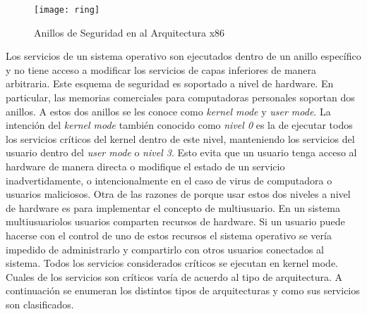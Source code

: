 \begin{figure}[htbp]
  \centering
  \texttt{[image: ring]}
  \caption{Anillos de Seguridad en al Arquitectura x86}
  \label{fig:ring}
\end{figure}

Los servicios de un sistema operativo son ejecutados dentro de un anillo
específico y no tiene acceso a modificar los servicios de capas inferiores de
manera arbitraria. Este esquema de seguridad es soportado a nivel de
hardware. En particular, las memorias comerciales para computadoras personales
soportan dos anillos. A estos dos anillos se les conoce como \emph{kernel mode}
y \emph{user mode}. La intención del \emph{kernel mode} también conocido como
\emph{nivel 0} es la de ejecutar todos los servicios críticos del kernel dentro
de este nivel, manteniendo los servicios del usuario dentro del \emph{user
mode} o \emph{nivel 3}. Esto evita que un usuario tenga acceso al hardware de
manera directa o modifique el estado de un servicio inadvertidamente, o
intencionalmente en el caso de virus de computadora o usuarios maliciosos. Otra
de las razones de porque usar estos dos niveles a nivel de hardware es para
implementar el concepto de multiusuario. En un sistema multiusuariolos usuarios
comparten recursos de hardware. Si un usuario puede hacerse con el control de
uno de estos recursos el sistema operativo se vería impedido de administrarlo y
compartirlo con otros usuarios conectados al sistema. Todos los servicios
considerados críticos se ejecutan en kernel mode. Cuales de los servicios son
críticos varía de acuerdo al tipo de arquitectura. A continuación se enumeran
los distintos tipos de arquitecturas y como sus servicios son clasificados.

